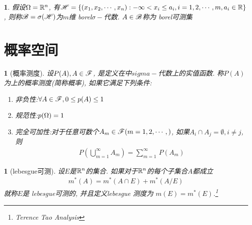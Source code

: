\newtheorem{borel_sigma_algebra}[theorem_root]{}
\begin{borel_sigma_algebra}
假设\(\mO = \Rs^n\), 有\(\msH = \{(x_1, x_2,\cdots,x_n):-\infty<x_i\le a_i, i = 1, 2, \cdots, m, a_i\in\Rs\}\),
则称\(\msB = \sigma(\msH)\)为$m$维 borel$\sigma-$代数.
$A\in \msB$称为 borel可测集
\end{borel_sigma_algebra}

\section{概率空间}

\newtheorem{probability_measure}[theorem_root]{}
\begin{probability_measure}[概率测度]
    设\(P(A), A\in\msF\), 是定义在\mO 中$sigma-$代数\msF 上的实值函数.
    称$P(A)$为\msF 上的概率测度(简称概率), 如果它满足下列条件:
    \begin{enumerate}
        \item 非负性:\quad \(\forall A\in\msF, 0\le p(A)\le 1\)
        \item 规范性:\quad \(p(\mO) = 1\)
        \item 完全可加性:\quad 对于任意可数个\(A_m\in\msF (m=1,2,\cdots,)\), 
        如果\(A_i\cap A_j = \emptyset, i\ne j\), 则
        \begin{align}
            P\left(\bigcup\limits_{m=1}^\infty A_m\right) = \sum\limits_{m=1}^\infty\,P(A_m)
        \end{align}
    \end{enumerate}
\end{probability_measure}

\newtheorem*{lebesgue_measurable}{\remark}
\begin{lebesgue_measurable}[lebesgue可测]
设\(E\)是\(\Rs^n\)的集合. 如果对于\(\Rs^n\)的每个子集合\(A\)都成立
\begin{align*}
m^\ast(A) = m^\ast(A\cap E) +  m^\ast(A/ E)
\end{align*}
就称\(E\)是 lebesgue可测的, 并且定义lebesgue 测度为 \(m(E)= m^\ast(E)\).\footnote{Terence Tao Analysis}
\end{lebesgue_measurable}

